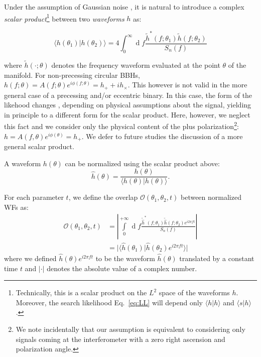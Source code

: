 \documentclass[twocolumn,showpacs,preprintnumbers,nofootinbib,prd,
superscriptaddress,10pt]{revtex4-2}
\renewcommand{\d}[1]{\ensuremath{\operatorname{d}\!{#1}}}
\newcommand{\scalar}[2]{\langle #1|#2 \rangle}
\begin{document}
Under the assumption of Gaussian noise \cite{Creighton_book}, it is natural to introduce a complex \textit{scalar product}\footnote{
Technically, this is a scalar product on the $L^2$ space of the waveforms $h$.
Moreover, the search likelihood Eq.~\eqref{eq:LL} will depend only $\scalar{h}{h}$ and $\scalar{s}{h}$.
} between two \textit{waveforms} $h$ as:

\begin{equation} \label{eq:scalar_product}
	\scalar{h(\theta_1)}{h(\theta_2)} = 4 \int_{0}^{\infty} \d{f} \frac{\tilde{h}^*(f;\theta_1) \tilde{h}(f;\theta_2)}{S_n(f)}
\end{equation}

where $\tilde{h}(\cdot; \theta)$ denotes the frequency waveform evaluated at the point $\theta$ of the manifold.
For non-precessing circular BBHs, $h(f; \theta) = A(f; \theta) e^{i\phi(f; \theta)} = h_+ + i h_\times$. This however is not valid in the more general case of a precessing and/or eccentric binary. In this case, the form of the likehood changes \cite{Harry:2016ijz, PhysRevD.97.023004, PhysRevD.94.024012}, depending on physical assumptions about the signal, yielding in principle to a different form for the scalar product. Here, however, we neglect this fact and we consider only the physical content of the plus polarization\footnote{
We note incidentally that our assumption is equivalent to considering only signals coming at the interferometer with a zero right ascension and polarization angle.}:
$h = A(f,\theta) e^{i\phi(\theta)} = h_+$. We defer to future studies the discussion of a more general scalar product.


A waveform $h(\theta)$ can be normalized using the scalar product above:
\begin{equation} \label{eq:normalization}
	\hat{h}(\theta) = \frac{h(\theta)}{\scalar{h(\theta)}{h(\theta)}}.
\end{equation}

For each parameter $t$, we define the overlap $\mathcal{O}(\theta_1,\theta_2, t)$ between normalized WFs as:
\begin{align}\label{eq:overlap}
	\mathcal{O}(\theta_1,\theta_2, t) &= \left\lvert \int\limits_{0}^{+\infty} \d{f} \frac{\tilde{\hat{h}}^*(f;\theta_1)\tilde{\hat{h}}(f;\theta_2) e^{i2\pi ft}}{S_n(f)} \right\rvert \nonumber\\
	&= \lvert \scalar{\hat{h}(\theta_1)}{\hat{h}(\theta_2)e^{i 2\pi ft}} \rvert
\end{align}
where we defined $\hat{h}(\theta)e^{i 2\pi ft}$ to be the waveform $\hat{h}(\theta)$ translated by a constant time $t$ and $\lvert \cdot \rvert$ denotes the absolute value of a complex number.
\end{document}
